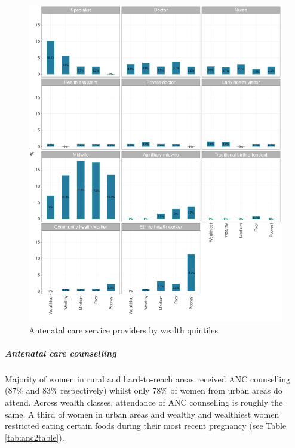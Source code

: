 \documentclass[12pt,a4paper]{article}
\let\oldsubparagraph\subparagraph
\renewcommand{\subparagraph}[1]{\oldsubparagraph{#1}\mbox{}}
\begin{document}
\begin{figure}[H]

{\centering \includegraphics{kayinReport_files/figure-latex/anc2Plot-1} 

}

\caption{Antenatal care service providers by wealth quintiles}\label{fig:anc2Plot}
\end{figure}

\newpage

\hypertarget{ancCounselling}{%
\subparagraph{Antenatal care counselling}\label{ancCounselling}}

Majority of women in rural and hard-to-reach areas received ANC counselling (87\% and 83\% respectively) whilst only 78\% of women from urban areas do attend. Across wealth classes, attendance of ANC counselling is roughly the same. A third of women in urban areas and wealthy and wealthiest women restricted eating certain foods during their most recent pregnancy (see Table \ref{tab:anc2table}).
\end{document}
